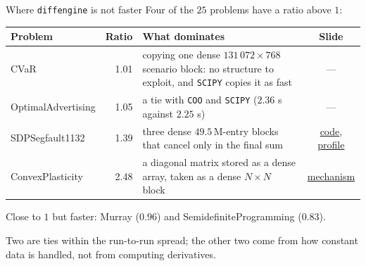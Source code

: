 \documentclass[10pt,mathserif,aspectratio=169]{beamer}
\newcommand{\de}{\texttt{diffengine}}
\begin{document}
\begin{frame}[label=bk-losses]{Where \de{} is not faster}
\vspace{-0.5ex}
{\small Four of the $25$ problems have a ratio above $1$:}

\vspace{1.5ex}
\begin{center}\footnotesize
\setlength{\tabcolsep}{6pt}
\begin{tabular}{@{}l r >{\raggedright\arraybackslash}p{8.2cm} c@{}}
\toprule
Problem & Ratio & What dominates & Slide \\
\midrule
CVaR & 1.01 & copying one dense $131\,072 \times 768$ scenario block: no structure to exploit,
  and \texttt{SCIPY} copies it as fast & --- \\
\addlinespace
OptimalAdvertising & 1.05 & a tie with \texttt{COO} and \texttt{SCIPY} ($2.36$ s against
  $2.25$ s) & --- \\
\addlinespace
SDPSegfault1132 & 1.39 & three dense $49.5$\,M-entry blocks that cancel only in the final
  sum & \hyperlink{bk-loss}{code}, \hyperlink{bk-sdpbreak}{profile} \\
\addlinespace
ConvexPlasticity & 2.48 & a diagonal matrix stored as a dense array, taken as a dense
  $N\times N$ block & \hyperlink{bk-plasticity}{mechanism} \\
\bottomrule
\end{tabular}
\end{center}

\vspace{1ex}
{\footnotesize\color{black!55} Close to $1$ but faster: Murray ($0.96$) and
SemidefiniteProgramming ($0.83$).}

\vspace{1.5ex}
\begin{center}\small\color{polyblue}
Two are ties within the run-to-run spread; the other two come from how constant data is
handled, not from computing derivatives.
\end{center}
\end{frame}
\end{document}
